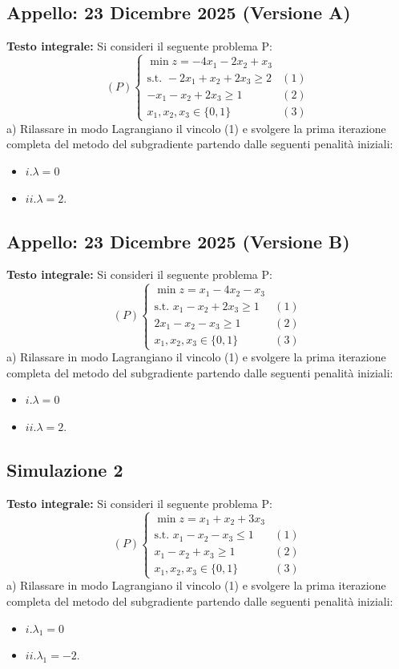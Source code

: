 \documentclass[11pt, a4paper]{article}
\begin{document}
\subsection{Appello: 23 Dicembre 2025 (Versione A)}
\textbf{Testo integrale:}
Si consideri il seguente problema P:
\[ (P) \begin{cases} \min z = -4x_1 - 2x_2 + x_3 \\ \text{s.t. } -2x_1 + x_2 + 2x_3 \ge 2 & (1) \\ -x_1 - x_2 + 2x_3 \ge 1 & (2) \\ x_1, x_2, x_3 \in \{0,1\} & (3) \end{cases} \]
a) Rilassare in modo Lagrangiano il vincolo (1) e svolgere la prima iterazione completa del metodo del subgradiente partendo dalle seguenti penalità iniziali:
\begin{itemize}
    \item $i. \lambda = 0$
    \item $ii. \lambda = 2$.
\end{itemize}

\subsection{Appello: 23 Dicembre 2025 (Versione B)}
\textbf{Testo integrale:}
Si consideri il seguente problema P:
\[ (P) \begin{cases} \min z = x_1 - 4x_2 - x_3 \\ \text{s.t. } x_1 - x_2 + 2x_3 \ge 1 & (1) \\ 2x_1 - x_2 - x_3 \ge 1 & (2) \\ x_1, x_2, x_3 \in \{0,1\} & (3) \end{cases} \]
a) Rilassare in modo Lagrangiano il vincolo (1) e svolgere la prima iterazione completa del metodo del subgradiente partendo dalle seguenti penalità iniziali:
\begin{itemize}
    \item $i. \lambda = 0$
    \item $ii. \lambda = 2$.
\end{itemize}

\subsection{Simulazione 2}
\textbf{Testo integrale:}
Si consideri il seguente problema P:
\[ (P) \begin{cases} \min z = x_1 + x_2 + 3x_3 \\ \text{s.t. } x_1 - x_2 - x_3 \le 1 & (1) \\ x_1 - x_2 + x_3 \ge 1 & (2) \\ x_1, x_2, x_3 \in \{0,1\} & (3) \end{cases} \]
a) Rilassare in modo Lagrangiano il vincolo (1) e svolgere la prima iterazione completa del metodo del subgradiente partendo dalle seguenti penalità iniziali:
\begin{itemize}
    \item $i. \lambda_1 = 0$
    \item $ii. \lambda_1 = -2$.
\end{itemize}
\end{document}

